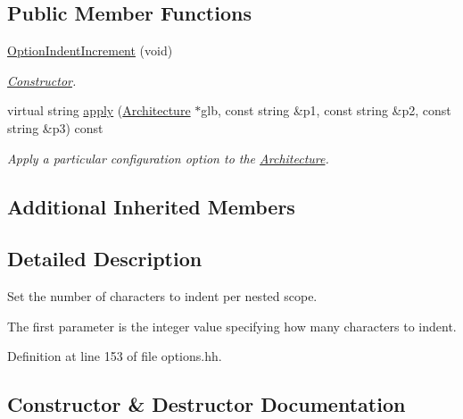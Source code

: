 \subsection*{Public Member Functions}
\begin{DoxyCompactItemize}
\item 
\mbox{\hyperlink{class_option_indent_increment_a64fdc8981f70b62eea46e56d32302155}{Option\+Indent\+Increment}} (void)
\begin{DoxyCompactList}\small\item\em \mbox{\hyperlink{class_constructor}{Constructor}}. \end{DoxyCompactList}\item 
virtual string \mbox{\hyperlink{class_option_indent_increment_a2f5a66d0ce8ae8863e3498449011d360}{apply}} (\mbox{\hyperlink{class_architecture}{Architecture}} $\ast$glb, const string \&p1, const string \&p2, const string \&p3) const
\begin{DoxyCompactList}\small\item\em Apply a particular configuration option to the \mbox{\hyperlink{class_architecture}{Architecture}}. \end{DoxyCompactList}\end{DoxyCompactItemize}
\subsection*{Additional Inherited Members}


\subsection{Detailed Description}
Set the number of characters to indent per nested scope. 

The first parameter is the integer value specifying how many characters to indent. 

Definition at line 153 of file options.\+hh.



\subsection{Constructor \& Destructor Documentation}
\mbox{\label{class_option_indent_increment_a64fdc8981f70b62eea46e56d32302155}} 
